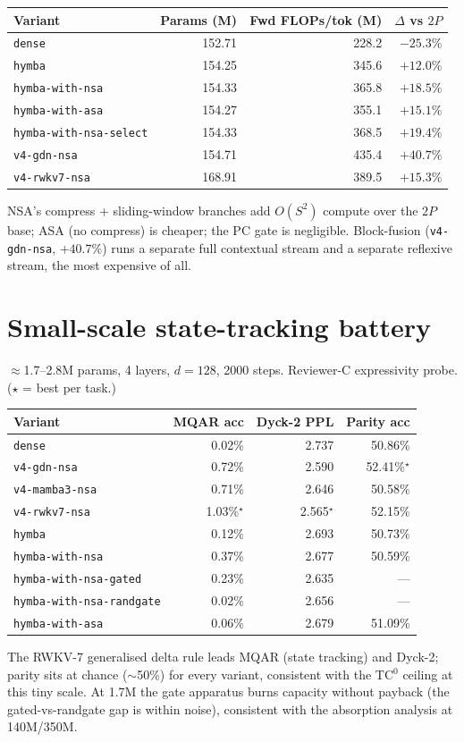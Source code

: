 \begin{center}
\begin{tabular}{lrrr}
\toprule
Variant & Params (M) & Fwd FLOPs/tok (M) & $\Delta$ vs $2P$ \\
\midrule
\texttt{dense} & 152.71 & 228.2 & $-25.3\%$ \\
\texttt{hymba} & 154.25 & 345.6 & $+12.0\%$ \\
\texttt{hymba-with-nsa} & 154.33 & 365.8 & $+18.5\%$ \\
\texttt{hymba-with-asa} & 154.27 & 355.1 & $+15.1\%$ \\
\texttt{hymba-with-nsa-select} & 154.33 & 368.5 & $+19.4\%$ \\
\texttt{v4-gdn-nsa} & 154.71 & 435.4 & $+40.7\%$ \\
\texttt{v4-rwkv7-nsa} & 168.91 & 389.5 & $+15.3\%$ \\
\bottomrule
\end{tabular}
\end{center}

NSA's compress + sliding-window branches add $O(S^2)$ compute over the $2P$
base; ASA (no compress) is cheaper; the PC gate is negligible. Block-fusion
(\texttt{v4-gdn-nsa}, $+40.7\%$) runs a separate full contextual stream and a
separate reflexive stream, the most expensive of all.

\section{Small-scale state-tracking battery}
\label{app:synthetics}
$\approx$1.7--2.8M params, 4 layers, $d{=}128$, 2000 steps. Reviewer-C
expressivity probe. ($\star$ = best per task.)

\begin{center}
\begin{tabular}{lrrr}
\toprule
Variant & MQAR acc & Dyck-2 PPL & Parity acc \\
\midrule
\texttt{dense} & 0.02\% & 2.737 & 50.86\% \\
\texttt{v4-gdn-nsa} & 0.72\% & 2.590 & 52.41\%$^\star$ \\
\texttt{v4-mamba3-nsa} & 0.71\% & 2.646 & 50.58\% \\
\texttt{v4-rwkv7-nsa} & 1.03\%$^\star$ & 2.565$^\star$ & 52.15\% \\
\texttt{hymba} & 0.12\% & 2.693 & 50.73\% \\
\texttt{hymba-with-nsa} & 0.37\% & 2.677 & 50.59\% \\
\texttt{hymba-with-nsa-gated} & 0.23\% & 2.635 & --- \\
\texttt{hymba-with-nsa-randgate} & 0.02\% & 2.656 & --- \\
\texttt{hymba-with-asa} & 0.06\% & 2.679 & 51.09\% \\
\bottomrule
\end{tabular}
\end{center}

The RWKV-7 generalised delta rule leads MQAR (state tracking) and Dyck-2;
parity sits at chance ($\sim$50\%) for every variant, consistent with the
TC$^0$ ceiling at this tiny scale. At 1.7M the gate apparatus burns capacity
without payback (the gated-vs-randgate gap is within noise), consistent with
the absorption analysis at 140M/350M.

